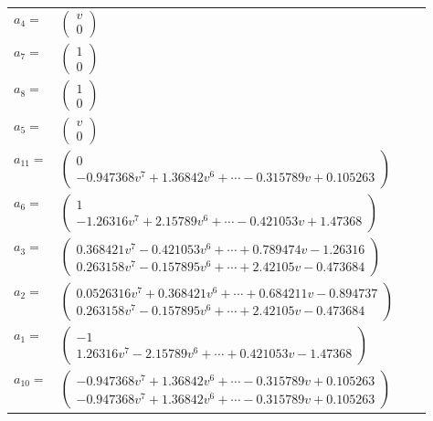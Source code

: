 \documentclass[1p]{elsarticle_modified}
\theoremstyle{definition}
\begin{document}
\begin{tabular}{m{7pt} m{180pt} m{7pt} m{180pt} }
\flushright $a_{4}=$&$\begin{pmatrix}v\\0\end{pmatrix}$ \\
\flushright $a_{7}=$&$\begin{pmatrix}1\\0\end{pmatrix}$ \\
\flushright $a_{8}=$&$\begin{pmatrix}1\\0\end{pmatrix}$ \\
\flushright $a_{5}=$&$\begin{pmatrix}v\\0\end{pmatrix}$ \\
\flushright $a_{11}=$&$\begin{pmatrix}0\\-0.947368 v^{7}+1.36842 v^{6}+\cdots-0.315789 v+0.105263\end{pmatrix}$ \\
\flushright $a_{6}=$&$\begin{pmatrix}1\\-1.26316 v^{7}+2.15789 v^{6}+\cdots-0.421053 v+1.47368\end{pmatrix}$ \\
\flushright $a_{3}=$&$\begin{pmatrix}0.368421 v^{7}-0.421053 v^{6}+\cdots+0.789474 v-1.26316\\0.263158 v^{7}-0.157895 v^{6}+\cdots+2.42105 v-0.473684\end{pmatrix}$ \\
\flushright $a_{2}=$&$\begin{pmatrix}0.0526316 v^{7}+0.368421 v^{6}+\cdots+0.684211 v-0.894737\\0.263158 v^{7}-0.157895 v^{6}+\cdots+2.42105 v-0.473684\end{pmatrix}$ \\
\flushright $a_{1}=$&$\begin{pmatrix}-1\\1.26316 v^{7}-2.15789 v^{6}+\cdots+0.421053 v-1.47368\end{pmatrix}$ \\
\flushright $a_{10}=$&$\begin{pmatrix}-0.947368 v^{7}+1.36842 v^{6}+\cdots-0.315789 v+0.105263\\-0.947368 v^{7}+1.36842 v^{6}+\cdots-0.315789 v+0.105263\end{pmatrix}$ \\

\end{tabular}
\end{document}
